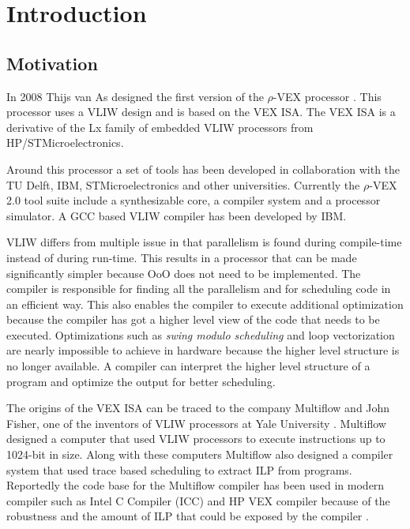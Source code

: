 \chapter{Introduction}
\section{Motivation}

In 2008 Thijs van As designed the first version of the $\rho$-VEX processor \cite{As:2008rt}. This processor uses a VLIW design and is based on the VEX ISA. The VEX ISA is a derivative of the Lx family of embedded VLIW processors \cite{854391} from HP/STMicroelectronics.

Around this processor a set of tools has been developed in collaboration with the TU Delft, IBM, STMicroelectronics and other universities. Currently the $\rho$-VEX 2.0 tool suite include a synthesizable core, a compiler system and a processor simulator. A GCC based VLIW compiler has been developed by IBM. 

VLIW differs from multiple issue in that parallelism is found during compile-time instead of during run-time. This results in a processor that can be made significantly simpler because OoO does not need to be implemented. The compiler is responsible for finding all the parallelism and for scheduling code in an efficient way. This also enables the compiler to execute additional optimization because the compiler has got a higher level view of the code that needs to be executed. Optimizations such as \emph{swing modulo scheduling} and loop vectorization are nearly impossible to achieve in hardware because the higher level structure is no longer available. A compiler can interpret the higher level structure of a program and optimize the output for better scheduling. 

The origins of the VEX ISA can be traced to the company Multiflow and John Fisher, one of the inventors of VLIW processors at Yale University \cite{Fisher:1983:VLI:1067651.801649}. Multiflow designed a computer that used VLIW processors to execute instructions up to 1024-bit in size. Along with these computers Multiflow also designed a compiler system that used trace based scheduling to extract ILP from programs. Reportedly the code base for the Multiflow compiler has been used in modern compiler such as Intel C Compiler (ICC) and HP VEX compiler because of the robustness and the amount of ILP that could be exposed by the compiler \cite{Lowney:1993qy}.


